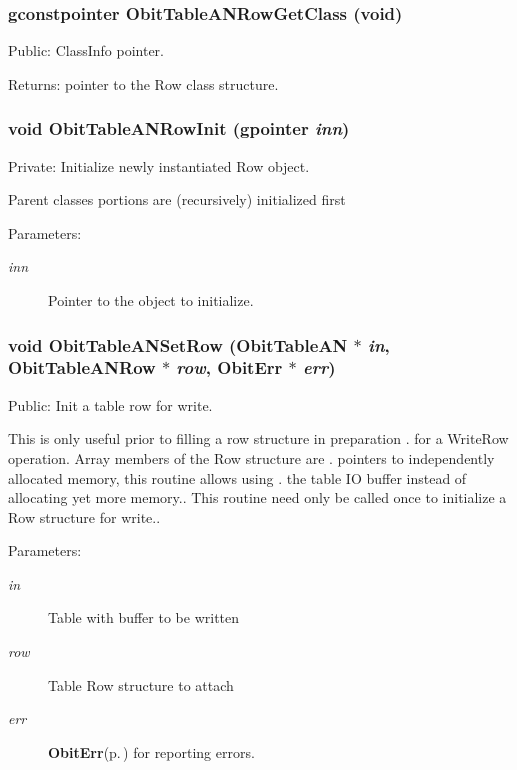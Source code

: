 \subsubsection{\setlength{\rightskip}{0pt plus 5cm}gconstpointer Obit\-Table\-ANRow\-Get\-Class (void)}\label{ObitTableAN_8c_a15}


Public: Class\-Info pointer. 

\begin{Desc}
\item[Returns:]pointer to the Row class structure. \end{Desc}
\subsubsection{\setlength{\rightskip}{0pt plus 5cm}void Obit\-Table\-ANRow\-Init (gpointer {\em inn})}\label{ObitTableAN_8c_a6}


Private: Initialize newly instantiated Row object. 

Parent classes portions are (recursively) initialized first \begin{Desc}
\item[Parameters:]
\begin{description}
\item[{\em inn}]Pointer to the object to initialize. \end{description}
\end{Desc}
\subsubsection{\setlength{\rightskip}{0pt plus 5cm}void Obit\-Table\-ANSet\-Row ({\bf Obit\-Table\-AN} $\ast$ {\em in}, {\bf Obit\-Table\-ANRow} $\ast$ {\em row}, {\bf Obit\-Err} $\ast$ {\em err})}\label{ObitTableAN_8c_a23}


Public: Init a table row for write. 

This is only useful prior to filling a row structure in preparation . for a Write\-Row operation. Array members of the Row structure are . pointers to independently allocated memory, this routine allows using . the table IO buffer instead of allocating yet more memory.. This routine need only be called once to initialize a Row structure for write.. \begin{Desc}
\item[Parameters:]
\begin{description}
\item[{\em in}]Table with buffer to be written \item[{\em row}]Table Row structure to attach \item[{\em err}]{\bf Obit\-Err}{\rm (p.\,\pageref{structObitErr})} for reporting errors. \end{description}
\end{Desc}
